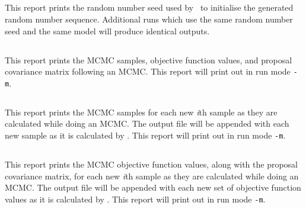 \subsection{}\label{sec:Report-RandomNumberSeed}

This report prints the random number seed used by \CNAME\ to initialise the generated random number sequence. Additional runs which use the same random number seed and the same model will produce identical outputs.

\subsection{}\label{sec:Report-MCMC}

This report prints the MCMC samples, objective function values, and proposal covariance matrix following an MCMC. This report will print out in run mode \texttt{-m}.

\subsection{}\label{sec:Report-MCMCSample}

This report prints the MCMC samples for each new \textit{i}th sample as they are calculated while doing an MCMC. The output file will be appended with each new sample as it is calculated by \CNAME. This report will print out in run mode \texttt{-m}.

\subsection{}\label{sec:Report-MCMCObjective}

This report prints the MCMC objective function values, along with the proposal covariance matrix, for each new \textit{i}th sample as they are calculated while doing an MCMC. The output file will be appended with each new set of objective function values as it is calculated by \CNAME. This report will print out in run mode \texttt{-m}.

\subsection{}\label{sec:Report-TimeVarying}

